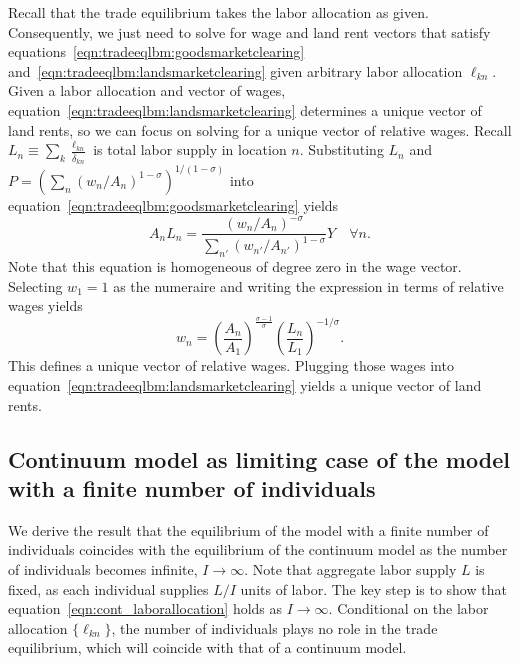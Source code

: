 \documentclass[11pt]{article}
\theoremstyle{definition}
\begin{document}
Recall that the trade equilibrium takes the labor allocation as given.
Consequently,
we just need to solve for wage and land rent vectors that satisfy
equations~\eqref{eqn:tradeeqlbm:goodsmarketclearing} and~\eqref{eqn:tradeeqlbm:landsmarketclearing}
given arbitrary labor allocation $\ell_{kn}$.
Given a labor allocation and vector of wages,
equation~\eqref{eqn:tradeeqlbm:landsmarketclearing} determines a unique vector of land rents,
so we can focus on solving for a unique vector of relative wages.
Recall $L_n \equiv \sum_k \frac{\ell_{kn}}{\bar{\delta}_{kn}}$
is total labor supply in location $n$.
Substituting $L_n$ and $P = \left(\sum_n (w_n/A_n)^{1-\sigma}\right)^{1/(1-\sigma)}$
into equation~\eqref{eqn:tradeeqlbm:goodsmarketclearing} yields
\begin{equation*}
A_n L_n 
=
\frac{(w_n / A_n)^{-\sigma}}{\sum_{n'} (w_{n'}/A_{n'})^{1-\sigma}} Y
\quad
\forall n.
\end{equation*}
Note that this equation is homogeneous of degree zero in the wage vector.
Selecting $w_1=1$ as the numeraire
and
writing the expression in terms of relative wages yields
\begin{equation*}
w_n
=
\left(\frac{A_n}{A_1}\right)^{\frac{\sigma-1}{\sigma}}
\left(\frac{L_n}{L_1}\right)^{-1/\sigma}.
\end{equation*}
This defines a unique vector of relative wages.
Plugging those wages into equation~\eqref{eqn:tradeeqlbm:landsmarketclearing}
yields a unique vector of land rents.

\subsection{Continuum model as limiting case of the model with a finite number of individuals}\label{sec:appendix:theorycont}

We derive the result that the equilibrium of the model with a finite number of individuals coincides with the equilibrium of the continuum model as the number of individuals becomes infinite, $I \to \infty$.
Note that aggregate labor supply $L$ is fixed, as each individual supplies $L/I$ units of labor.
The key step is to show that equation~\eqref{eqn:cont_laborallocation} holds as $I \to \infty$.
Conditional on the labor allocation $\{\ell_{kn}\}$,
the number of individuals plays no role in the trade equilibrium,
which will coincide with that of a continuum model.
\end{document}
